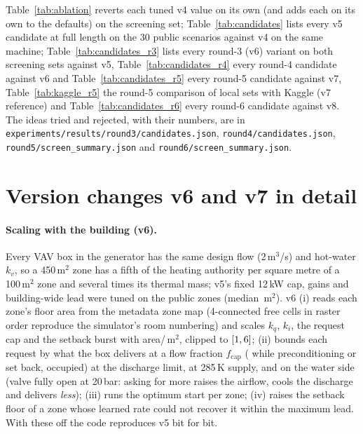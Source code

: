 \documentclass{article}
\begin{document}
Table~\ref{tab:ablation} reverts each tuned v4 value on its own (and adds each on its own to
the defaults) on the screening set; Table~\ref{tab:candidates} lists every v5 candidate at
full length on the 30 public scenarios against v4 on the same machine;
Table~\ref{tab:candidates_r3} lists every round-3 (v6) variant on both screening sets against
v5, Table~\ref{tab:candidates_r4} every round-4 candidate against v6 and Table~\ref{tab:candidates_r5}
every round-5 candidate against v7, Table~\ref{tab:kaggle_r5} the round-5 comparison of local sets with Kaggle
(v7 reference) and Table~\ref{tab:candidates_r6} every round-6 candidate against v8. The ideas tried and rejected,
with their numbers, are in \texttt{experiments/results/round3/candidates.json}, \texttt{round4/candidates.json},
\texttt{round5/screen\_summary.json} and \texttt{round6/screen\_summary.json}.






\section{Version changes v6 and v7 in detail}
\label{app:versions}

\paragraph{Scaling with the building (v6).}
Every VAV box in the generator has the same design flow (2\,m$^3$/s) and hot-water $k_v$, so
a 450\,m$^2$ zone has a fifth of the heating authority per square metre of a 100\,m$^2$ zone
and several times its thermal mass; v5's fixed 12\,kW cap, gains and building-wide lead were
tuned on the public zones (median \PubZoneAreaMedian\,m$^2$). v6 (i) reads each zone's floor
area from the metadata zone map (4-connected free cells in raster order reproduce the
simulator's room numbering) and scales $k_q$, $k_i$, the request cap and the setback burst with
area/\ParAreaRef\,m$^2$, clipped to $[1, 6]$; (ii) bounds each
request by what the box delivers at a flow fraction $f_{\text{cap}}$ (\VSixFCapPre{} while
preconditioning or set back, \ParFCapOcc{} occupied) at the discharge limit, at 285\,K supply,
and on the water side (valve fully open at 20\,bar: asking for more raises the airflow, cools
the discharge and delivers \emph{less}); (iii) runs the optimum start per zone; (iv) raises the
setback floor of a zone whose learned rate could not recover it within the maximum lead. With
these off the code reproduces v5 bit for bit.
\end{document}
